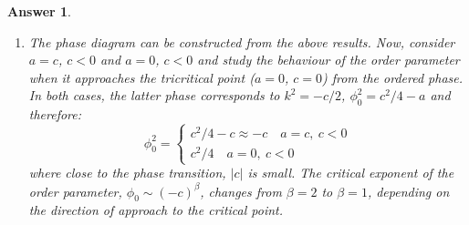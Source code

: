 \documentclass[a4paper]{article}
\newtheorem{ans}{Answer}[section]
\theoremstyle{new}
\begin{document}
\begin{ans}
\begin{enumerate}[label=(\alph*)]
\begin{itemize}
    Whenever the finite-$k$ solution is allowed, it is indeed the global minimum of the free energy. 
\end{itemize}
There is no dependence on $\delta$ in the free energy since it represents a global phase in the order parameter, and the free energy is symmetric upon changes in the global phase. In the ordered phase, the system will spontaneously choose a value for $\delta$, but this choice is determined by the free energy minimization principle. This is spontaneous breaking of global phase symmetry.
\item The phase diagram can be constructed from the above results. Now, consider $a=c$, $c<0$ and $a=0$, $c<0$ and study the behaviour of the order parameter when it approaches the tricritical point ($a=0$, $c=0$) from the ordered phase. In both cases, the latter phase corresponds to $k^2=-c/2$, $\phi_0^2=c^2/4-a$ and therefore:
    \begin{equation*}
        \phi_0^2 = \begin{cases}
                        c^2/4-c\approx -c\quad a=c,~c<0 \\
                        c^2/4\quad a=0,~c<0
\end{cases}
\end{equation*}
where close to the phase transition, $|c|$ is small. The critical exponent of the order parameter, $\phi_0\sim(-c)^\beta$, changes from $\beta=2$ to $\beta=1$, depending on the direction of approach to the critical point.
\end{enumerate} 
\end{ans}
\end{document}
